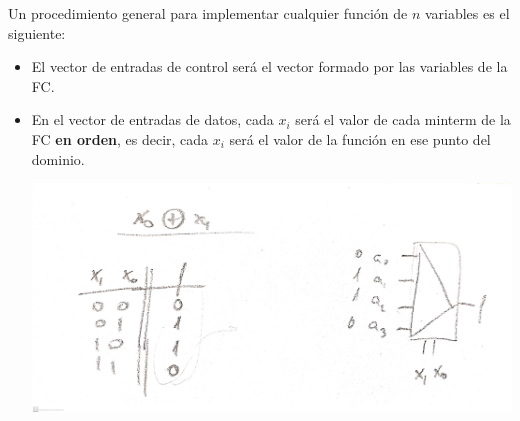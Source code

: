 \documentclass[a4paper,10pt]{book}
\begin{document}
Un procedimiento general para implementar cualquier función de $n$ variables es el siguiente:
\begin{itemize}
\item El vector de entradas de control será el vector formado por las variables de la FC.

\item En el vector de entradas de datos, cada $x_i$ será el valor de cada minterm de la FC \textbf{en orden}, es decir, cada $x_i$ será el valor de la función en ese punto del dominio.

\begin{center}
\includegraphics[scale=0.08]{aplicacion multiplexor 1}
\end{center}
\end{itemize}
\end{document}
